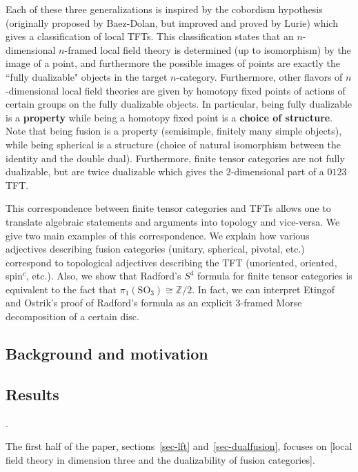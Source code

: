\documentclass{amsart}
\begin{document}
Each of these three generalizations is inspired by the cobordism hypothesis (originally proposed by Baez-Dolan, but improved and proved by Lurie) which gives a classification of local TFTs.  This classification states that an $n$-dimensional $n$-framed local field theory is determined (up to isomorphism) by the image of a point, and furthermore the possible images of points are exactly the ``fully dualizable" objects in the target $n$-category.  Furthermore, other flavors of $n$-dimensional local field theories are given by homotopy fixed points of actions of certain groups on the fully dualizable objects.  In particular, being fully dualizable is a {\bf property} while being a homotopy fixed point is a {\bf choice of structure}.  Note that being fusion is a property (semisimple, finitely many simple objects), while being spherical is a structure (choice of natural isomorphism between the identity and the double dual).  Furthermore, finite tensor categories are not fully dualizable, but are twice dualizable which gives the $2$-dimensional part of a $0123$ TFT.


This correspondence between finite tensor categories and TFTs allows one to translate algebraic statements and arguments into topology and vice-versa.  We give two main examples of this correspondence.  We explain how various adjectives describing fusion categories (unitary, spherical, pivotal, etc.) correspond to topological adjectives describing the TFT (unoriented, oriented, spin${}^c$, etc.).  Also, we show that Radford's $S^4$ formula for finite tensor categories is equivalent to the fact that $\pi_1(\mathrm{SO}_3) \cong \mathbb{Z}/2$.  In fact, we can interpret Etingof and Ostrik's proof of Radford's formula as an explicit $3$-framed Morse decomposition of a certain disc.



\subsection{Background and motivation}

\subsection{Results}.


The first half of the paper, sections~\ref{sec-lft} and~\ref{sec-dualfusion}, focuses on [local field theory in dimension three and the dualizability of fusion categories].
\end{document}
